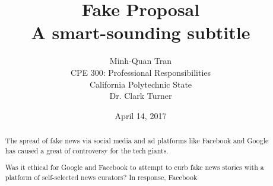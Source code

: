 


\title{\vfill Fake Proposal\\
\vspace{8pt}
\normalsize{A smart-sounding subtitle}
}

\author{Minh-Quan Tran\\
\normalsize{CPE 300: Professional Responsibilities}\\
\normalsize{California Polytechnic State}\\
\normalsize{Dr. Clark Turner}
}

\date{April 14, 2017}

\maketitle


\vfill

\begin{abstract}
The spread of fake news via social media and ad platforms like Facebook and Google has caused a great of controversy for the tech giants. \cite{telegraph_fake_news}

Was it ethical for Google and Facebook to attempt to curb fake news stories with a platform of self-selected news curators?
In response, Facebook
\end{abstract}

\thispagestyle{empty} 
\pagebreak